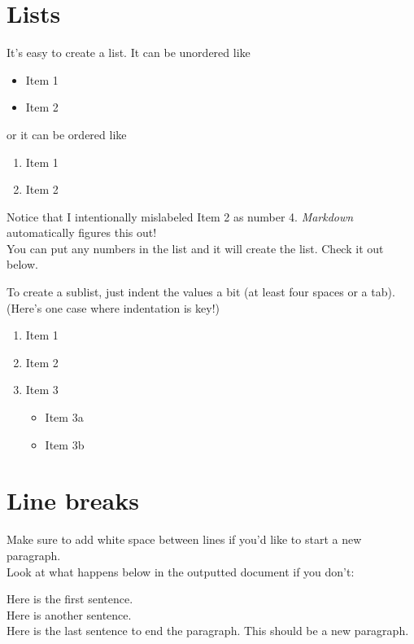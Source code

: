 \documentclass[12pt,oneside]{tisemthesis}
\providecommand{\tightlist}{%
  \setlength{\itemsep}{0pt}\setlength{\parskip}{0pt}}
\begin{document}
\hypertarget{lists}{%
\section{Lists}\label{lists}}

It's easy to create a list. It can be unordered like
\begin{itemize}
\tightlist
\item
  Item 1
\item
  Item 2
\end{itemize}
or it can be ordered like
\begin{enumerate}
\def\labelenumi{\arabic{enumi}.}
\tightlist
\item
  Item 1
\item
  Item 2
\end{enumerate}
Notice that I intentionally mislabeled Item 2 as number 4.
\emph{Markdown} automatically figures this out!\\
You can put any numbers in the list and it will create the list.
Check it out below.

To create a sublist, just indent the values a bit (at least four spaces or a tab).\\
(Here's one case where indentation is key!)
\begin{enumerate}
\def\labelenumi{\arabic{enumi}.}
\tightlist
\item
  Item 1
\item
  Item 2
\item
  Item 3
  \begin{itemize}
  \tightlist
  \item
    Item 3a
  \item
    Item 3b
  \end{itemize}
\end{enumerate}
\hypertarget{line-breaks}{%
\section{Line breaks}\label{line-breaks}}

Make sure to add white space between lines if you'd like to start a new paragraph.\\
Look at what happens below in the outputted document if you don't:

Here is the first sentence.\\
Here is another sentence.\\
Here is the last sentence to end the paragraph.
This should be a new paragraph.
\end{document}
